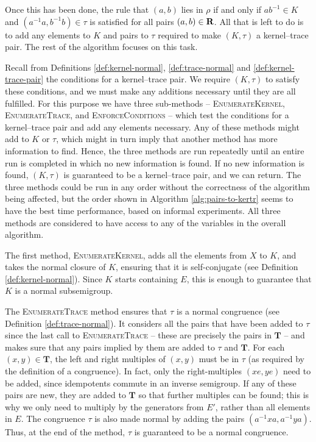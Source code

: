 Once this has been done, the rule that $(a,b)$ lies in $\rho$ if and only if
$ab^{-1} \in K$ and $(a^{-1}a, b^{-1}b) \in \tau$ is satisfied for all pairs
$(a,b) \in \mathbf{R}$.  All that is left to do is to add any elements to $K$
and pairs to $\tau$ required to make $(K, \tau)$ a kernel--trace pair.  The rest
of the algorithm focuses on this task.

Recall from Definitions \ref{def:kernel-normal}, \ref{def:trace-normal} and
\ref{def:kernel-trace-pair} the conditions for a kernel--trace pair.  We require
$(K, \tau)$ to satisfy these conditions, and we must make any additions
necessary until they are all fulfilled.  For this purpose we have three
sub-methods -- \textsc{EnumerateKernel}, \textsc{EnumerateTrace}, and
\textsc{EnforceConditions} -- which test the conditions for a kernel--trace pair
and add any elements necessary.  Any of these methods might add to $K$ or
$\tau$, which might in turn imply that another method has more information to
find.  Hence, the three methods are run repeatedly until an entire run is
completed in which no new information is found.  If no new information is found,
$(K, \tau)$ is guaranteed to be a kernel--trace pair, and we can return.  The
three methods could be run in any order without the correctness of the algorithm
being affected, but the order shown in Algorithm \ref{alg:pairs-to-kertr} seems
to have the best time performance, based on informal experiments.  All three
methods are considered to have access to any of the variables in the overall
algorithm.

The first method, \textsc{EnumerateKernel}, adds all the elements from $X$ to
$K$, and takes the normal closure of $K$, ensuring that it is self-conjugate
(see Definition \ref{def:kernel-normal}).  Since $K$ starts containing $E$, this
is enough to guarantee that $K$ is a normal subsemigroup.

The \textsc{EnumerateTrace} method ensures that $\tau$ is a normal congruence
(see Definition \ref{def:trace-normal}).  It considers all the pairs that have
been added to $\tau$ since the last call to \textsc{EnumerateTrace} -- these are
precisely the pairs in $\mathbf{T}$ -- and makes sure that any pairs implied by
them are added to $\tau$ and $\mathbf{T}$.  For each $(x,y) \in \mathbf{T}$, the
left and right multiples of $(x,y)$ must be in $\tau$ (as required by the
definition of a congruence).  In fact, only the right-multiples $(xe, ye)$ need
to be added, since idempotents commute in an inverse semigroup.  If any of these
pairs are new, they are added to $\mathbf{T}$ so that further multiples can be
found; this is why we only need to multiply by the generators from $E'$, rather
than all elements in $E$.  The congruence $\tau$ is also made normal by adding
the pairs $(a^{-1}xa, a^{-1}ya)$.  Thus, at the end of the method, $\tau$ is
guaranteed to be a normal congruence.

